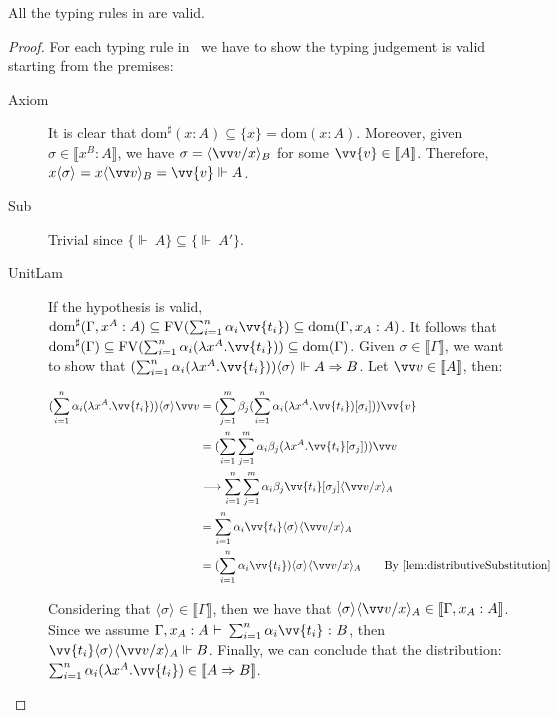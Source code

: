 \documentclass[runningheads,orivec,envcountsame,envcountsect]{llncs}
\newcommand\lra{\longrightarrow}
\newcommand\ansubst[2]{\ensuremath{\langle #1 \rangle_{#2}}}
\newcommand\dom[1]{\mathrm{dom}(#1)}
\newcommand\sdom[1]{\mathrm{dom}^{\sharp}(#1)}
\newcommand\FV[1]{\mathrm{FV}(#1)}
\def\Lam#1#2#3{\lambda#1^{#2}{.}#3} %
\def\Arr{\Rightarrow}
\def\sem#1{\llbracket#1\rrbracket}
\def\semr#1{\{{\real}~#1\}}
\def\TYP#1#2#3{#1~{\vdash}~#2~{:}~#3}
\def\real{\Vdash}
\begin{document}
\begin{restatelemma}
  All the typing rules in  are valid.
\end{restatelemma}
\begin{proof}
    For each typing rule in ~we have to show the typing judgement is valid starting from the premises:
    \begin{description}
    \item[Axiom] It is clear that $\sdom{x:A}\subseteq\{x\}=\dom{x:A}$. Moreover, given $\sigma\in\sem{x^B:A}$, we have $\sigma=\ansubst{\vv v/x}{B}$ for some $\vv{v}\in\sem{A}$. Therefore, $x\ansubst{\sigma}{}=x\ansubst{\vv v}{B}=\vv{v}\real A$.
    
    \item[Sub] Trivial since $\semr{A}\subseteq\semr{A'}$. 

    \item[UnitLam] If the hypothesis is valid, $\sdom{\Gamma,x^A:A}\subseteq \FV{\sum_{i=1}^{n}\alpha_i \vv{t_i}}\subseteq \dom{\Gamma,x_A:A}$. It follows that $\sdom{\Gamma}\subseteq \FV{\sum_{i=1}^{n}\alpha_i (\Lam{x}{A}{\vv{t_i}})}\subseteq \dom{\Gamma}$. Given $\sigma\in\sem{\Gamma}$, we want to show that $(\sum_{i=1}^{n}\alpha_i (\Lam{x}{A}{\vv{t_i}}))\ansubst{\sigma}{}\real A\Arr B$. Let $\vv v\in\sem{A}$, then:
    
    \begin{align*}
        (\sum_{i=1}^{n} \alpha_i(\Lam{x}{A}{\vv{t_i}}))\ansubst{\sigma}{} \vv v&= (\sum_{j=1}^{m} \beta_j (\sum_{i=1}^{n} \alpha_i (\Lam{x}{A}{\vv{t_i}}) [\sigma_i])) \vv{v} \\
        &= (\sum_{i=1}^{n}\sum_{j=1}^{m}\alpha_i\beta_j (\Lam{x}{A}{\vv{t_i}[\sigma_j]}))\vv v\\
        &\lra \sum_{i=1}^{n}\sum_{j=1}^{m}\alpha_i\beta_j \vv{t_i}[\sigma_j]\ansubst{\vv v/x}{A}\\
        &=\sum_{i=1}^{n}\alpha_i \vv{t_i}\ansubst{\sigma}{}\ansubst{\vv v/x}{A}\\
        &=(\sum_{i=1}^{n}\alpha_i \vv{t_i})\ansubst{\sigma}{}\ansubst{\vv v/x}{A}\qquad{\text{By \Cref{lem:distributiveSubstitution}}}
    \end{align*}
    
    Considering that $\ansubst{\sigma}{}\in\sem{\Gamma}$, then we have that $\ansubst{\sigma}{}\ansubst{\vv v/x}{A}\in\sem{\Gamma,x_A:A}$. Since we assume $\TYP{\Gamma, x_A:A}{\sum_{i=1}^{n}\alpha_i\vv{t_i}}{B}$, then $\vv{t_i}\ansubst{\sigma}{}\ansubst{\vv v/x}{A}\real B$. Finally, we can conclude that the distribution: $\sum_{i=1}^{n}\alpha_i (\Lam{x}{A}{\vv{t_i}})\in\sem{A\Arr B}$.


\end{description}
\end{proof}
\end{document}
